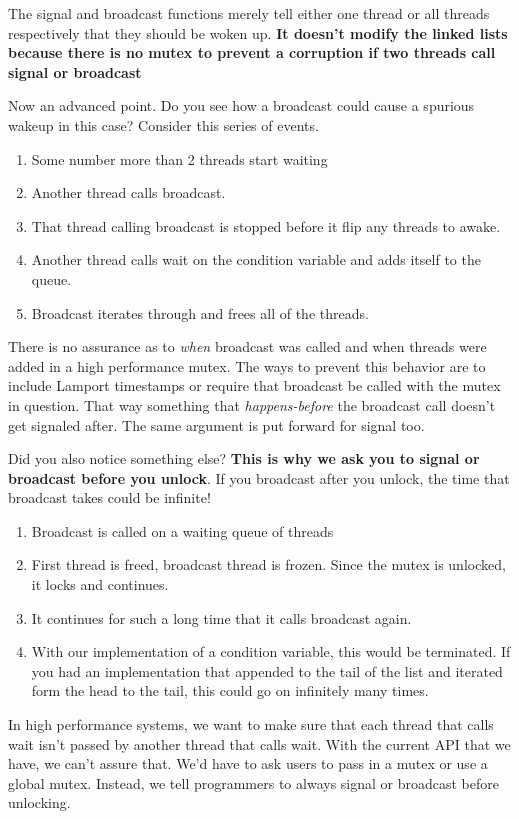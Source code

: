 The signal and broadcast functions merely tell either one thread or all threads respectively that they should be woken up.
\textbf{It doesn't modify the linked lists because there is no mutex to prevent a corruption if two threads call signal or broadcast}

Now an advanced point. Do you see how a broadcast could cause a spurious wakeup in this case? Consider this series of events.

\begin{enumerate}
\item Some number more than 2 threads start waiting
\item Another thread calls broadcast.
\item That thread calling broadcast is stopped before it flip any threads to awake.
\item Another thread calls wait on the condition variable and adds itself to the queue.
\item Broadcast iterates through and frees all of the threads.
\end{enumerate}

There is no assurance as to \textit{when} broadcast was called and when threads were added in a high performance mutex.
The ways to prevent this behavior are to include Lamport timestamps or require that broadcast be called with the mutex in question.
That way something that \textit{happens-before} the broadcast call doesn't get signaled after.
The same argument is put forward for signal too.

Did you also notice something else?
\textbf{This is why we ask you to signal or broadcast before you unlock}.
If you broadcast after you unlock, the time that broadcast takes could be infinite!
\begin{enumerate}
\item Broadcast is called on a waiting queue of threads
\item First thread is freed, broadcast thread is frozen. Since the mutex is unlocked, it locks and continues.
\item It continues for such a long time that it calls broadcast again.
\item With our implementation of a condition variable, this would be terminated. If you had an implementation that appended to the tail of the list and iterated form the head to the tail, this could go on infinitely many times.
\end{enumerate}

In high performance systems, we want to make sure that each thread that calls wait isn't passed by another thread that calls wait.
With the current API that we have, we can't assure that.
We'd have to ask users to pass in a mutex or use a global mutex.
Instead, we tell programmers to always signal or broadcast before unlocking.

